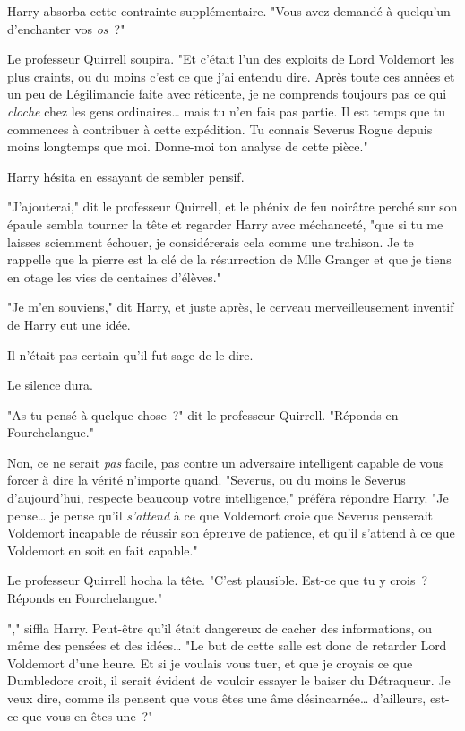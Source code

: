 Harry absorba cette contrainte supplémentaire. "Vous avez demandé à quelqu'un d'enchanter vos \emph{os}~?"

Le professeur Quirrell soupira. "Et c'était l'un des exploits de Lord Voldemort les plus craints, ou du moins c'est ce que j'ai entendu dire. Après toute ces années et un peu de Légilimancie faite avec réticente, je ne comprends toujours pas ce qui \emph{cloche} chez les gens ordinaires… mais tu n'en fais pas partie. Il est temps que tu commences à contribuer à cette expédition. Tu connais Severus Rogue depuis moins longtemps que moi. Donne-moi ton analyse de cette pièce."

Harry hésita en essayant de sembler pensif.

"J'ajouterai," dit le professeur Quirrell, et le phénix de feu noirâtre perché sur son épaule sembla tourner la tête et regarder Harry avec méchanceté, "que si tu me laisses sciemment échouer, je considérerais cela comme une trahison. Je te rappelle que la pierre est la clé de la résurrection de Mlle Granger et que je tiens en otage les vies de centaines d'élèves."

"Je m'en souviens," dit Harry, et juste après, le cerveau merveilleusement inventif de Harry eut une idée.

Il n'était pas certain qu'il fut sage de le dire.

Le silence dura.

"As-tu pensé à quelque chose~?" dit le professeur Quirrell. "Réponds en Fourchelangue."

Non, ce ne serait \emph{pas} facile, pas contre un adversaire intelligent capable de vous forcer à dire la vérité n'importe quand. "Severus, ou du moins le Severus d'aujourd'hui, respecte beaucoup votre intelligence," préféra répondre Harry. "Je pense… je pense qu'il \emph{s'attend} à ce que Voldemort croie que Severus penserait Voldemort incapable de réussir son épreuve de patience, et qu'il s'attend à ce que Voldemort en soit en fait capable."

Le professeur Quirrell hocha la tête. "C'est plausible. Est-ce que tu y crois~? Réponds en Fourchelangue."

"," siffla Harry. Peut-être qu'il était dangereux de cacher des informations, ou même des pensées et des idées… "Le but de cette salle est donc de retarder Lord Voldemort d'une heure. Et si je voulais vous tuer, et que je croyais ce que Dumbledore croit, il serait évident de vouloir essayer le baiser du Détraqueur. Je veux dire, comme ils pensent que vous êtes une âme désincarnée… d'ailleurs, est-ce que vous en êtes une~?"

